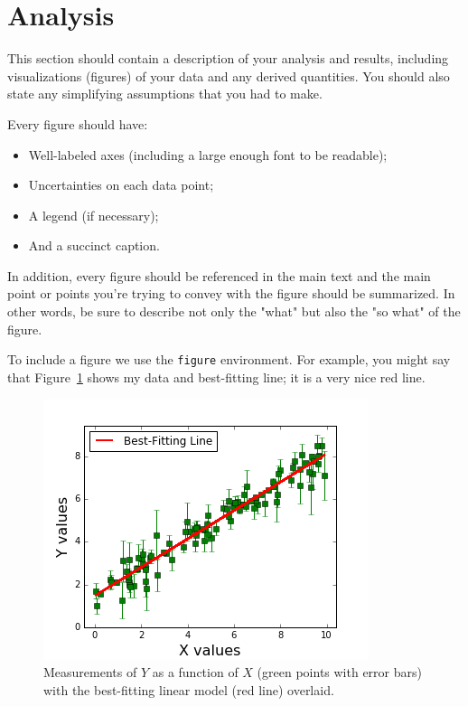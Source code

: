 \documentclass{revtex4}
\begin{document}
\section{Analysis}\label{sec:analysis}

This section should contain a description of your analysis and results, including visualizations (figures) of your data and any derived quantities. You should also state any simplifying assumptions that you had to make.  

Every figure should have:
\begin{itemize}
\item{Well-labeled axes (including a large enough font to be readable);}
\item{Uncertainties on each data point;}
\item{A legend (if necessary);}
\item{And a succinct caption.}
\end{itemize}

In addition, every figure should be referenced in the main text and the main point or points you're trying to convey with the figure should be summarized.  In other words, be sure to describe not only the "what" but also the "so what" of the figure. 

To include a figure we use the {\tt figure} environment. For example, you might say that Figure~\ref{fig:example} shows my data and best-fitting line; it is a very nice
red line.
\begin{figure}[!h] %
\includegraphics[height=3in]{example-figure.png}
\caption{Measurements of $Y$ as a function of $X$ (green points with error bars) with the best-fitting linear model (red line) overlaid. \label{fig:example}}
\end{figure}
\end{document}
